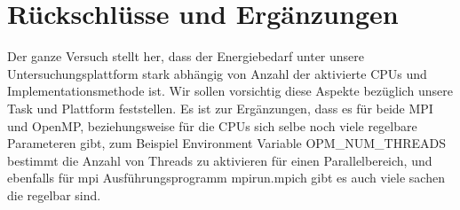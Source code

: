 \chapter{Rückschlüsse und Ergänzungen}
\label{chap:Rueckschluesse und Ergaenzunen}

Der ganze Versuch stellt her, dass der Energiebedarf unter unsere Untersuchungsplattform stark abhängig von Anzahl der aktivierte CPUs und Implementationsmethode ist. Wir sollen vorsichtig diese Aspekte bezüglich unsere Task und Plattform feststellen. Es ist zur Ergänzungen, dass es für beide MPI und OpenMP, beziehungsweise für die CPUs sich selbe noch viele regelbare Parameteren gibt, zum Beispiel Environment Variable OPM\_NUM\_THREADS bestimmt die Anzahl von Threads zu aktivieren für einen Parallelbereich, und ebenfalls für mpi Ausführungsprogramm mpirun.mpich gibt es auch viele sachen die regelbar sind.
